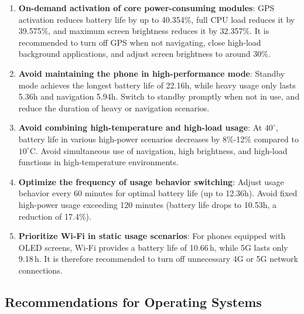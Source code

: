 \documentclass{mcmthesis}  %
\begin{document}
	
	\begin{enumerate}[label=\bfseries\arabic*.]
		\item \textbf{On-demand activation of core power-consuming modules}: GPS activation reduces battery life by up to 40.354\%, full CPU load reduces it by 39.575\%, and maximum screen brightness reduces it by 32.357\%. It is recommended to turn off GPS when not navigating, close high-load background applications, and adjust screen brightness to around 30\%.
		
		\item \textbf{Avoid maintaining the phone in high-performance mode}: Standby mode achieves the longest battery life of 22.16h, while heavy usage only lasts 5.36h and navigation 5.94h. Switch to standby promptly when not in use, and reduce the duration of heavy or navigation scenarios.
		
		\item \textbf{Avoid combining high-temperature and high-load usage}: At $40^\circ$, battery life in various high-power scenarios decreases by 8\%-12\% compared to $10^\circ\mathrm{C}$. Avoid simultaneous use of navigation, high brightness, and high-load functions in high-temperature environments.
		
		\item \textbf{Optimize the frequency of usage behavior switching}: Adjust usage behavior every 60 minutes for optimal battery life (up to 12.36h). Avoid fixed high-power usage exceeding 120 minutes (battery life drops to 10.53h, a reduction of 17.4\%).
		
		\item \textbf{Prioritize Wi‑Fi in static usage scenarios}: For phones equipped with OLED screens, Wi‑Fi provides a battery life of 10.66 h, while 5G lasts only 9.18 h. It is therefore recommended to turn off unnecessary 4G or 5G network connections.
	\end{enumerate}
	
	
	\subsection{Recommendations for Operating Systems}
	
\end{document}
